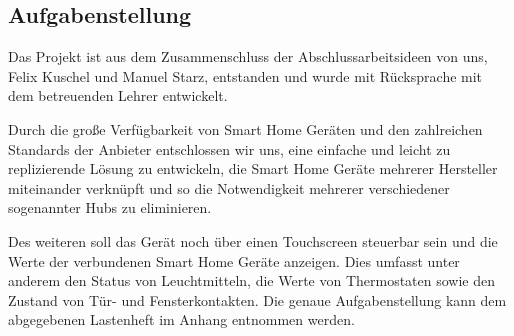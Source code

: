 \subsection{Aufgabenstellung}
Das Projekt ist aus dem Zusammenschluss der Abschlussarbeitsideen von uns, Felix Kuschel und Manuel Starz, entstanden und wurde mit Rücksprache mit dem betreuenden Lehrer entwickelt.\par
Durch die große Verfügbarkeit von Smart Home Geräten und den zahlreichen Standards der Anbieter entschlossen wir uns, eine einfache und leicht zu replizierende Lösung zu entwickeln, die Smart Home Geräte mehrerer Hersteller miteinander verknüpft und so die Notwendigkeit mehrerer verschiedener sogenannter Hubs zu eliminieren. \par
Des weiteren soll das Gerät noch über einen Touchscreen steuerbar sein und die Werte der verbundenen Smart Home Geräte anzeigen. Dies umfasst unter anderem den Status von Leuchtmitteln, die Werte von Thermostaten sowie den Zustand von Tür- und Fensterkontakten. Die genaue Aufgabenstellung kann dem abgegebenen Lastenheft im Anhang entnommen werden.